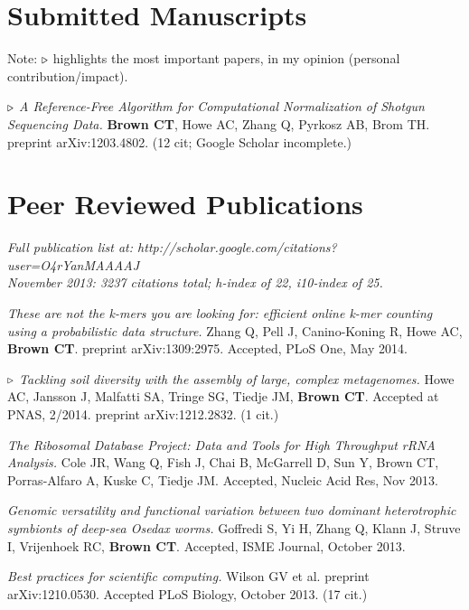 \documentclass[margin,line]{resume}
\begin{document}
\begin{resume}

    \section{\mysidestyle Submitted Manuscripts}

Note: {\color{red} ${\bf \triangleright}$} highlights the most important
papers, in my opinion (personal contribution/impact).

{\color{red} ${\bf \triangleright}$}
{\em A Reference-Free Algorithm for Computational Normalization of Shotgun Sequencing Data.} {\bf Brown CT}, Howe AC, Zhang Q, Pyrkosz AB, Brom TH. preprint arXiv:1203.4802. (12 cit; Google Scholar incomplete.)

    \section{\mysidestyle Peer Reviewed Publications}

{\em Full publication list at: http://scholar.google.com/citations?user=O4rYanMAAAAJ\\
November 2013: 3237 citations total; h-index of 22, i10-index of 25.}

{\em These are not the k-mers you are looking for: efficient online
  k-mer counting using a probabilistic data structure.} Zhang Q, Pell
J, Canino-Koning R, Howe AC, {\bf Brown CT}.  preprint
arXiv:1309:2975.  Accepted, PLoS One, May 2014.

{\color{red} ${\bf \triangleright}$}
{\em Tackling soil diversity with the assembly of large, complex metagenomes.}
Howe AC, Jansson J, Malfatti SA, Tringe SG, Tiedje JM, {\bf Brown CT}. Accepted at PNAS, 2/2014.  preprint arXiv:1212.2832. (1 cit.)

{\em The Ribosomal Database Project: Data and Tools for High Throughput rRNA Analysis.} Cole JR, Wang Q, Fish J, Chai B, McGarrell D, Sun Y, Brown CT, Porras-Alfaro A, Kuske C, Tiedje JM.  Accepted, Nucleic Acid Res, Nov 2013.

{\em Genomic versatility and functional variation between two dominant
heterotrophic symbionts of deep-sea {\rm Osedax} worms.} Goffredi S, Yi H, Zhang Q, Klann J, Struve I, Vrijenhoek RC, {\bf Brown CT}. Accepted, ISME Journal, October 2013.

{\em Best practices for scientific computing.} Wilson GV et al. preprint arXiv:1210.0530. Accepted PLoS Biology, October 2013. (17 cit.)


\end{resume}
\end{document}
